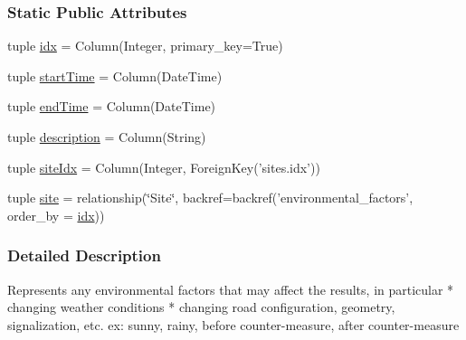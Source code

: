 \subsubsection*{Static Public Attributes}
\begin{DoxyCompactItemize}
\item 
tuple \hyperlink{classmetadata_1_1EnvironementalFactors_ae098f6dc54e0df53a8e40b63ad8f2950}{idx} = Column(Integer, primary\-\_\-key=True)
\item 
tuple \hyperlink{classmetadata_1_1EnvironementalFactors_afecc3211391a18b1750051da30ea0bfc}{start\-Time} = Column(Date\-Time)
\item 
tuple \hyperlink{classmetadata_1_1EnvironementalFactors_a68f7a51d43489a9eaeb8d103860f9158}{end\-Time} = Column(Date\-Time)
\item 
tuple \hyperlink{classmetadata_1_1EnvironementalFactors_a8d362ee1e898cf877c83edbe9f0c971e}{description} = Column(String)
\item 
tuple \hyperlink{classmetadata_1_1EnvironementalFactors_ad244fb9dc07336c2284a8d74c3ec10a7}{site\-Idx} = Column(Integer, Foreign\-Key('sites.\-idx'))
\item 
tuple \hyperlink{classmetadata_1_1EnvironementalFactors_a2d1bb47f71311626cc0023b26530edbb}{site} = relationship(\char`\"{}Site\char`\"{}, backref=backref('environmental\-\_\-factors', order\-\_\-by = \hyperlink{classmetadata_1_1EnvironementalFactors_ae098f6dc54e0df53a8e40b63ad8f2950}{idx}))
\end{DoxyCompactItemize}


\subsubsection{Detailed Description}
\begin{DoxyVerb}Represents any environmental factors that may affect the results, in particular
* changing weather conditions
* changing road configuration, geometry, signalization, etc.
ex: sunny, rainy, before counter-measure, after counter-measure\end{DoxyVerb}
 

